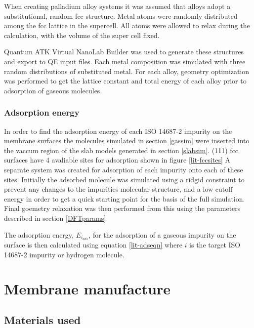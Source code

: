 When creating palladium alloy systems it was assumed that alloys adopt a substitutional, random fcc structure. Metal atoms were randomly distributed among the fcc lattice in the supercell. All atoms were allowed to relax during the calculation, with the volume of the super cell fixed. 

Quantum ATK Virtual NanoLab Builder was used to generate these structures and export to QE input files. Each metal composition was simulated with three random distributions of substituted metal. For each alloy, geometry optimization was performed to get the lattice constant and total energy of each alloy prior to adsorption of gaseous molecules.

\subsubsection{Adsorption energy}
In order to find the adsorption energy of each ISO 14687-2 impurity on the membrane surfaces the molecules simulated in section \ref{gassim} were inserted into the vaccum region of the slab models generated in section \ref{slabsim}. (111) fcc surfaces have 4 avaliable sites for adsorption shown in figure \ref{lit-fccsites} A separate system was created for adsorption of each impurity onto each of these sites. Initially the adsorbed molecule was simulated using a ridgid constraint to prevent any changes to the impurities molecular structure, and a low cutoff energy in order to get a quick starting point for the basis of the full simulation. Final goemetry relaxation was then performed from this using the parameters described in section \ref{DFTparams}

The adsorption energy, $E_{i_{ads}}$, for the adsorption of a gaseous impurity on the surface is then calculated using equation \ref{lit-adseqn} where $i$ is the target ISO 14687-2 impurity or hydrogen molecule.

\section{Membrane manufacture}

\subsection{Materials used}
